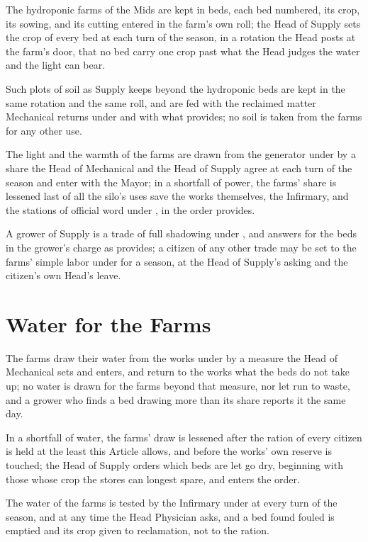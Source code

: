 \begin{clauses}
\item The hydroponic farms of the Mids are kept in beds, each bed numbered, its crop, its sowing, and its cutting entered in the farm's own roll; the Head of Supply sets the crop of every bed at each turn of the season, in a rotation the Head posts at the farm's door, that no bed carry one crop past what the Head judges the water and the light can bear.
\item Such plots of soil as Supply keeps beyond the hydroponic beds are kept in the same rotation and the same roll, and are fed with the reclaimed matter Mechanical returns under  and with what  provides; no soil is taken from the farms for any other use.
\item The light and the warmth of the farms are drawn from the generator under  by a share the Head of Mechanical and the Head of Supply agree at each turn of the season and enter with the Mayor; in a shortfall of power, the farms' share is lessened last of all the silo's uses save the works themselves, the Infirmary, and the stations of official word under , in the order  provides.
\item A grower of Supply is a trade of full shadowing under , and answers for the beds in the grower's charge as  provides; a citizen of any other trade may be set to the farms' simple labor under  for a season, at the Head of Supply's asking and the citizen's own Head's leave.
\end{clauses}

\section{Water for the Farms}
\label{sec:supply:water-for-the-farms}

\begin{clauses}
\item The farms draw their water from the works under  by a measure the Head of Mechanical sets and enters, and return to the works what the beds do not take up; no water is drawn for the farms beyond that measure, nor let run to waste, and a grower who finds a bed drawing more than its share reports it the same day.
\item In a shortfall of water, the farms' draw is lessened after the ration of every citizen is held at the least this Article allows, and before the works' own reserve is touched; the Head of Supply orders which beds are let go dry, beginning with those whose crop the stores can longest spare, and enters the order.
\item The water of the farms is tested by the Infirmary under  at every turn of the season, and at any time the Head Physician asks, and a bed found fouled is emptied and its crop given to reclamation, not to the ration.
\end{clauses}


